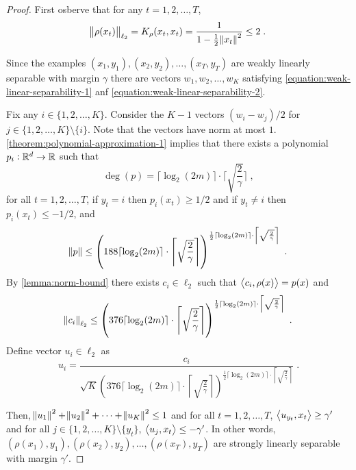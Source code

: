 \begin{proof}
First osberve that for any $t=1,2,\dots,T$,
$$
\norm{\rho(x_t)}_{\ell_2} = K_{\rho}(x_t,x_t) = \frac{1}{1 - \frac{1}{2} \norm{x_t}^2} \le 2 \; .
$$

Since the examples $(x_1, y_1), (x_2, y_2), \dots, (x_T, y_T)$ are weakly linearly separable
with margin $\gamma$ there are vectors $w_1, w_2, \dots, w_K$ satisfying
\eqref{equation:weak-linear-separability-1} anf \eqref{equation:weak-linear-separability-2}.

Fix any $i \in \{1,2,\dots,K\}$. Consider the $K-1$ vectors
$(w_i - w_j)/2$ for $j \in \{1,2,\dots,K\} \setminus \{i\}$. Note that the vectors
have norm at most $1$.
\autoref{theorem:polynomial-approximation-1} implies that
there exists a polynomial $p_i:\mathbb{R}^d \to \mathbb{R}$ such
that
$$
\deg(p) = \lceil \log_2(2m) \rceil \cdot \lceil \sqrt{\frac{2}{\gamma}} \rceil \; ,
$$
for all $t=1,2,\dots,T$, if $y_t = i$ then $p_i(x_t) \ge 1/2$ and if $y_t \neq i$ then $p_i(x_t) \le -1/2$,
and
$$
\norm{p} \le \left(188 \lceil \log_2(2m) \rceil \cdot \left \lceil \sqrt{\frac{2}{\gamma}} \right \rceil \right)^{\frac{1}{2} \lceil \log_2(2m) \rceil
\cdot \left \lceil \sqrt{\frac{2}{\gamma}} \right \rceil} \; .
$$
By \autoref{lemma:norm-bound} there exists $c_i \in \ell_2$ such that
$\left\langle c_i, \rho(x) \right\rangle = p(x)$ and
$$
\norm{c_i}_{\ell_2}
\le \left(376 \lceil \log_2(2m) \rceil \cdot \left \lceil \sqrt{\frac{2}{\gamma}} \right \rceil \right)^{\frac{1}{2} \lceil \log_2(2m) \rceil
\cdot \left \lceil \sqrt{\frac{2}{\gamma}} \right \rceil} \; .
$$
Define vector $u_i \in \ell_2$ as
$$
u_i = \frac{c_i}{\sqrt{K} \left(376 \lceil \log_2(2m) \rceil \cdot \left \lceil \sqrt{\frac{2}{\gamma}} \right \rceil \right)^{\frac{1}{2} \lceil \log_2(2m) \rceil
\cdot \left \lceil \sqrt{\frac{2}{\gamma}} \right \rceil}} \; .
$$

Then, $\norm{u_1}^2 + \norm{u_2}^2 + \dots + \norm{u_K}^2 \le 1$ and
for all $t=1,2,\dots,T$, $\left\langle u_{y_t}, x_t \right\rangle \ge \gamma'$
and for all $j \in \{1,2,\dots,K\} \setminus \{y_t\}$,
$\left\langle u_j, x_t \right\rangle \le - \gamma'$. In other words,
$(\rho(x_1), y_1), (\rho(x_2), y_2), \dots, (\rho(x_T), y_T)$ are
strongly linearly separable with margin $\gamma'$.
\end{proof}
